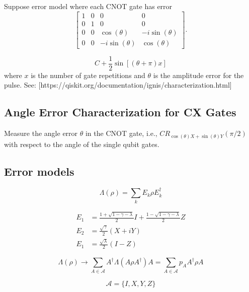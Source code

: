 \documentclass[11pt, oneside]{article}   	%
\begin{document}
Suppose error model where each CNOT gate has error
\begin{equation}
\begin{bmatrix}
1 & 0 & 0 & 0 \\
0 & 1 & 0 & 0 \\
0 & 0 & \cos (\theta) & -i  \sin (\theta) \\
0 & 0 & - i \sin (\theta) & \cos (\theta)
\end{bmatrix}.
\end{equation}


\begin{equation}
C + \frac{1}{2} \sin \left[ \left( \theta + \pi\right) x \right]
\end{equation}
where $x$ is the number of gate repetitions and $\theta$ is the amplitude error for the pulse.
See: [https://qiskit.org/documentation/ignis/characterization.html]

\subsection{Angle Error Characterization for CX Gates}
Measure the angle error $\theta$ in the CNOT gate, i.e., $CR_{\cos(\theta)X+\sin(\theta)Y}(\pi/2)$ with respect to the angle of the single qubit gates.

\subsection{Error models}
\begin{equation}
\Lambda(\rho) = \sum_k E_k \rho E^{\dagger}_k
\end{equation}

\begin{align}
E_1 &= \frac{1 + \sqrt{1 - \gamma - \lambda}}{2} I + \frac{1 - \sqrt{1 - \gamma - \lambda}}{2} Z \\
E_2 &= \frac{\sqrt{\gamma}}{2} (X + iY) \\
E_1 &= \frac{\sqrt{\lambda}}{2} (I - Z)
\end{align}

\begin{equation}
\Lambda(\rho) 
\to \sum_{A \in \mathcal{A}} A^{\dagger} \Lambda(A \rho A^{\dagger}) A
= \sum_{A \in \mathcal{A}} p_A A^{\dagger} \rho A
\end{equation}

\begin{equation}
\mathcal{A} = \{ I, X, Y, Z \}
\end{equation}
\end{document}
